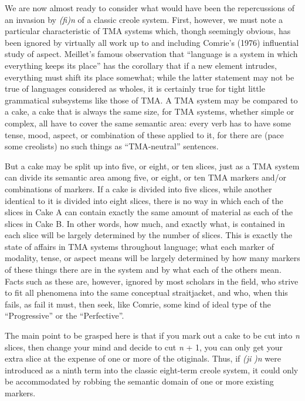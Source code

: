 We are now almost ready to consider what would have been the repercussions of an invasion by \textit{(fi)n} of a classic creole system. First, however, we must note a particular characteristic of TMA systems which, thongh seemingly obvious, has been ignored by virtually all work up to and including Comrie's (1976) influential study of aspect. Meillet's famous observation that ``language is a system in which every\-thing keeps its place'' has the corollary that if a new element intrudes, everything must shift its place somewhat; while the latter statement may not be true of languages considered as wholes, it is certainly true for tight little grammatical subsystems like those of TMA. A TMA system may be compared to a cake, a cake that is always the same size, for TMA systems, whether simple or complex, all have to cover the same semantic area: every verb has to have some tense, mood, aspect, or combination of these applied to it, for there are (pace some creolists) no such things as ``TMA-neutral'' sentences.

But a cake may be split up into five, or eight, or ten slices, just as a TMA system can divide its semantic area among five, or eight, or ten TMA markers and/or combinations of markers. If a cake is divided into five slices, while another identical to it is divided into eight slices, there is no way in which each of the slices in Cake A can contain exactly the same amount of material as each of the slices in Cake B. In other words, how much, and exactly what, is contained in each slice will be largely determined by the number of slices. This is exactly the state of affairs in TMA systems throughout language; what each marker of modality, tense, or aspect means will be largely determined by how many markers of these things there are in the system and by what each of the others mean. Facts such as these are, however, ignored by most scholars in the field, who strive to fit all phenomena into the same conceptual straitjacket, and who, when
this fails, as fail it must, then seek, like Comrie, some kind of ideal type of the ``Progressive'' or the ``Perfective''.

The main point to be grasped here is that if you mark out a cake
to be cut into \textit{n} slices, then change your mind and decide to cut \textit{n} + 1, you can only get your extra slice at the expense of one or more of the otiginals. Thus, if \textit{(ji} \textit{)n} were introduced as a ninth term into the classic eight-term creole system, it could only be accommodated by robbing the semantic domain of one or more existing markers.

